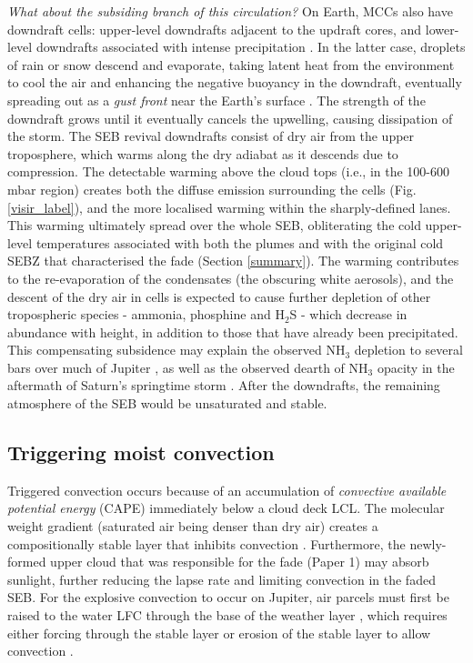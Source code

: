 \documentclass[final,authoryear,5p,times,twocolumn]{elsarticle}
\begin{document}
\textit{What about the subsiding branch of this circulation?}  On Earth, MCCs also have downdraft cells: upper-level downdrafts adjacent to the updraft cores, and lower-level downdrafts associated with intense precipitation \citep{93houze}.  In the latter case, droplets of rain or snow descend and evaporate, taking latent heat from the environment to cool the air and enhancing the negative buoyancy in the downdraft, eventually spreading out as a \textit{gust front} near the Earth's surface \citep{06wallace}.  The strength of the downdraft grows until it eventually cancels the upwelling, causing dissipation of the storm.  The SEB revival downdrafts consist of dry air from the upper troposphere, which warms along the dry adiabat as it descends due to compression.  The detectable warming above the cloud tops (i.e., in the 100-600 mbar region) creates both the diffuse emission surrounding the cells (Fig. \ref{visir_label}), and the more localised warming within the sharply-defined lanes.  This warming ultimately spread over the whole SEB, obliterating the cold upper-level temperatures associated with both the plumes and with the original cold SEBZ that characterised the fade (Section \ref{summary}). The warming contributes to the re-evaporation of the condensates (the obscuring white aerosols), and the descent of the dry air in cells is expected to cause further depletion of other tropospheric species - ammonia, phosphine and H$_2$S - which decrease in abundance with height, in addition to those that have already been precipitated.  This compensating subsidence may explain the observed NH$_3$ depletion to several bars over much of Jupiter \citep{01depater, 05showman}, as well as the observed dearth of NH$_3$ opacity in the aftermath of Saturn's springtime storm \citep{13janssen, 13laraia}.  After the downdrafts, the remaining atmosphere of the SEB would be unsaturated and stable.  

\subsection{Triggering moist convection}
Triggered convection occurs because of an accumulation of \textit{convective available potential energy} (CAPE) immediately below a cloud deck LCL.  The molecular weight gradient (saturated air being denser than dry air) creates a compositionally stable layer that inhibits convection \citep{00nakajima, 15li}.  Furthermore, the newly-formed upper cloud that was responsible for the fade (Paper 1) may absorb sunlight, further reducing the lapse rate and limiting convection in the faded SEB.  For the explosive convection to occur on Jupiter, air parcels must first be raised to the water LFC through the base of the weather layer \citep{86stoker}, which requires either forcing through the stable layer \citep[e.g., Fig. \ref{convection} and][]{14sugiyama} or erosion of the stable layer to allow convection \citep[e.g., ][]{15li}.  
\end{document}
